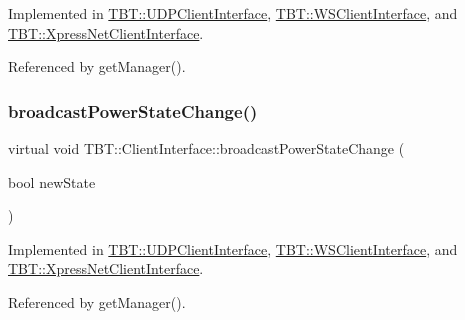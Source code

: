 Implemented in \hyperlink{classTBT_1_1UDPClientInterface_af4e63115b3156b151d4dfd50342b36e7_af4e63115b3156b151d4dfd50342b36e7}{T\+B\+T\+::\+U\+D\+P\+Client\+Interface}, \hyperlink{classTBT_1_1WSClientInterface_a39806206461815c06c517b66d122b4db_a39806206461815c06c517b66d122b4db}{T\+B\+T\+::\+W\+S\+Client\+Interface}, and \hyperlink{classTBT_1_1XpressNetClientInterface_a8e64404cb84913c2d9290d2afb882b39_a8e64404cb84913c2d9290d2afb882b39}{T\+B\+T\+::\+Xpress\+Net\+Client\+Interface}.



Referenced by get\+Manager().

\mbox{\label{classTBT_1_1ClientInterface_a7888a3446fb416fad75e5e008a85ca0c_a7888a3446fb416fad75e5e008a85ca0c}} 
\subsubsection{\texorpdfstring{broadcast\+Power\+State\+Change()}{broadcastPowerStateChange()}}
{\footnotesize\ttfamily virtual void T\+B\+T\+::\+Client\+Interface\+::broadcast\+Power\+State\+Change (\begin{DoxyParamCaption}\item[{bool}]{new\+State }\end{DoxyParamCaption})\hspace{0.3cm}{\ttfamily [pure virtual]}}



Implemented in \hyperlink{classTBT_1_1UDPClientInterface_a60ddc3657a12b4e6c7ef7db0a31c9e3c_a60ddc3657a12b4e6c7ef7db0a31c9e3c}{T\+B\+T\+::\+U\+D\+P\+Client\+Interface}, \hyperlink{classTBT_1_1WSClientInterface_ad1c7f413c63f04b04d6e20f5d154d1fd_ad1c7f413c63f04b04d6e20f5d154d1fd}{T\+B\+T\+::\+W\+S\+Client\+Interface}, and \hyperlink{classTBT_1_1XpressNetClientInterface_a338da1925ec68f197e87625c7497f472_a338da1925ec68f197e87625c7497f472}{T\+B\+T\+::\+Xpress\+Net\+Client\+Interface}.



Referenced by get\+Manager().

\mbox{\label{classTBT_1_1ClientInterface_a26e144856b1253744b20c5638065acf7_a26e144856b1253744b20c5638065acf7}} 
